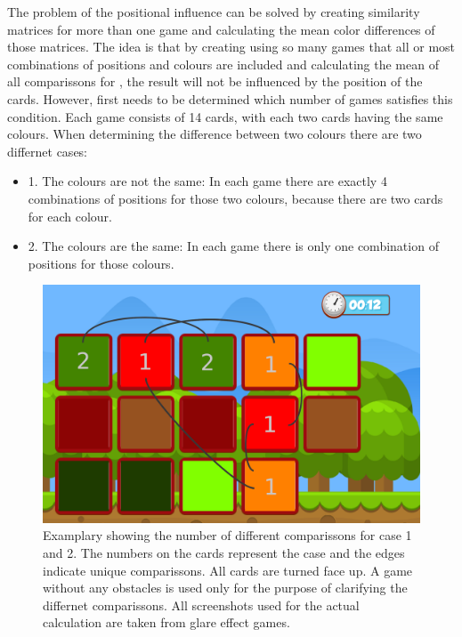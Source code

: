 The problem of the positional influence can be solved by creating similarity matrices for more than one game and calculating the mean color differences of those matrices. The idea is that by creating using so many games that all or most combinations of positions and colours are included and calculating the mean of all comparissons for , the result will not be influenced by the position of the cards.  However, first needs to be determined which number of games satisfies this condition. Each game consists of 14 cards, with each two cards having the same colours. When determining the difference between two colours there are two differnet cases: 
\begin{itemize}
	\item 1. The colours are not the same: In each game there are exactly 4 combinations of positions for those two colours, because there are two cards for each colour. 
	\item 2. The colours are the same: In each game there is only one combination of positions for those colours.  
\end{itemize}

\begin{figure}[H]
	\centering
	\includegraphics[width=14.5cm]{images/noObstTurnedNotes.png}
	\caption[Bild kurz]{Examplary showing the number of different comparissons for case 1 and 2. The numbers on the cards represent the case and the edges indicate unique comparissons. All cards are turned face up. A game without any obstacles is used only for the purpose of clarifying the differnet comparissons. All screenshots used for the actual calculation are taken from glare effect games.}
	\label{fig:noObstTurnedNotes}
\end{figure}

